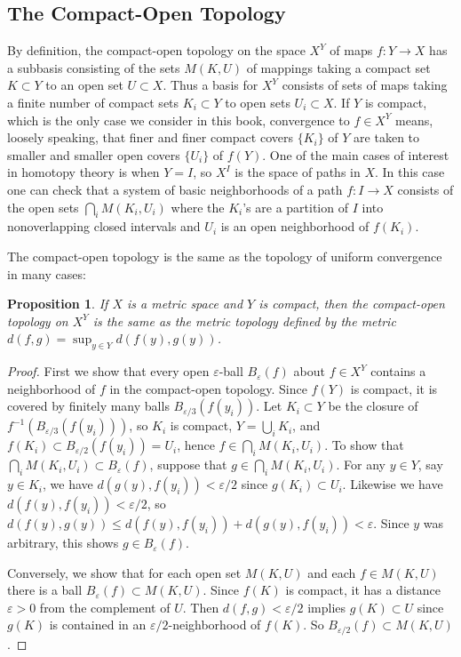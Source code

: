 \documentclass{article}
\newtheorem{proposition}[theorem]{Proposition}
\theoremstyle{definition}
\begin{document}
\subsection*{The Compact-Open Topology}

By definition, the compact-open topology on the space $X^Y$ of maps $f: Y \rightarrow X$ has a subbasis consisting of the sets $M(K, U)$ of mappings taking a compact set $K \subset Y$ to an open set $U \subset X$. Thus a basis for $X^Y$ consists of sets of maps taking a finite number of compact sets $K_i \subset Y$ to open sets $U_i \subset X$. If $Y$ is compact, which is the only case we consider in this book, convergence to $f \in X^Y$ means, loosely speaking, that finer and finer compact covers $\{K_i\}$ of $Y$ are taken to smaller and smaller open covers $\{U_i\}$ of $f(Y)$. One of the main cases of interest in homotopy theory is when $Y = I$, so $X^I$ is the space of paths in $X$. In this case one can check that a system of basic neighborhoods of a path $f: I \rightarrow X$ consists of the open sets $\bigcap_i M(K_i, U_i)$ where the $K_i$'s are a partition of $I$ into nonoverlapping closed intervals and $U_i$ is an open neighborhood of $f(K_i)$.

The compact-open topology is the same as the topology of uniform convergence in many cases:

\begin{proposition}
If $X$ is a metric space and $Y$ is compact, then the compact-open topology on $X^Y$ is the same as the metric topology defined by the metric $d(f, g) = \sup_{y \in Y} d(f(y), g(y))$.
\end{proposition}

\begin{proof}
First we show that every open $\varepsilon$-ball $B_\varepsilon(f)$ about $f \in X^Y$ contains a neighborhood of $f$ in the compact-open topology. Since $f(Y)$ is compact, it is covered by finitely many balls $B_{\varepsilon/3}(f(y_i))$. Let $K_i \subset Y$ be the closure of $f^{-1}(B_{\varepsilon/3}(f(y_i)))$, so $K_i$ is compact, $Y = \bigcup_i K_i$, and $f(K_i) \subset B_{\varepsilon/2}(f(y_i)) = U_i$, hence $f \in \bigcap_i M(K_i, U_i)$. To show that $\bigcap_i M(K_i, U_i) \subset B_\varepsilon(f)$, suppose that $g \in \bigcap_i M(K_i, U_i)$. For any $y \in Y$, say $y \in K_i$, we have $d(g(y), f(y_i)) < \varepsilon/2$ since $g(K_i) \subset U_i$. Likewise we have $d(f(y), f(y_i)) < \varepsilon/2$, so $d(f(y), g(y)) \leq d(f(y), f(y_i)) + d(g(y), f(y_i)) < \varepsilon$. Since $y$ was arbitrary, this shows $g \in B_\varepsilon(f)$.

Conversely, we show that for each open set $M(K, U)$ and each $f \in M(K, U)$ there is a ball $B_\varepsilon(f) \subset M(K, U)$. Since $f(K)$ is compact, it has a distance $\varepsilon > 0$ from the complement of $U$. Then $d(f, g) < \varepsilon/2$ implies $g(K) \subset U$ since $g(K)$ is contained in an $\varepsilon/2$-neighborhood of $f(K)$. So $B_{\varepsilon/2}(f) \subset M(K, U)$.
\end{proof}
\end{document}
